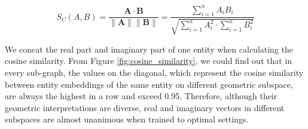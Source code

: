 \documentclass[letterpaper]{article} %
\begin{document}
\begin{equation}
S_C(A, B)=\frac{\mathbf{A} \cdot \mathbf{B}}{\|\mathbf{A}\|\|\mathbf{B}\|}=\frac{\sum_{i=1}^n A_i B_i}{\sqrt{\sum_{i=1}^n A_i^2 \cdot \sum_{i=1}^n B_i^2}}
\end{equation}

We concat the real part and imaginary part of one entity when calculating the cosine similarity. From Figure \ref{fig:cosine_similarity}, we could find out that in every sub-graph, the values on the diagonal, which represent the cosine similarity between entity embeddings of the same entity on different geometric subspace, are always the highest in a row and exceed 0.95. Therefore, although their geometric interpretations are diverse, real and imaginary vectors in different subspaces are almost unanimous when trained to optimal settings.
\end{document}
